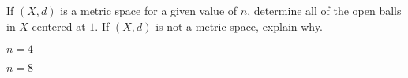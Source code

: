 {\begin{itemize}
If $(X,d)$ is a metric space for a given value of $n$, determine all of the open balls in $X$ centered at $1$. If $(X,d)$ is not a metric space, explain why. 
	\end{itemize}

\ba
\item $n = 4$

\item $n = 8$

\ea

\begin{comment}

\ExerciseSolution

\ba
\item  Since $xy-1 \pmod{4}$ is never negative, we see that $d(x,y) \geq 0$ for all $x,y \in X$. To determine if $d(x,y) = 0$ if and only if $x=y$, we calculate all of the distances as shown in Table \ref{T:d_example_4}.
\begin{table}[h]
\begin{center}
\begin{tabular}{|c|c|c|c|} \hline
		&$1$	&$3$	&$5$	\\ \hline
$1$		&$0$	&$2$	&$0$	\\ \hline
$3$		&$2$	&$0$	&$2$	\\ \hline
$5$		&$0$	&$2$	&$0$	\\ \hline
\end{tabular}
\caption{Values of $d$ with $n=4$.}
\label{T:d_example_4}
\end{center}	
\end{table}
Note that $d(1,5)=0$, but $1 \neq 5$. Thus, $d$ is not a metric on $X$. 

\item  Since $xy-1 \pmod{8}$ is never negative, we see that $d(x,y) \geq 0$ for all $x,y \in X$. To verify that $d(x,y) = 0$ if and only if $x=y$, we calculate all of the distances as shown in Table \ref{T:d_example_8}.
\begin{table}[h]
\begin{center}
\begin{tabular}{|c|c|c|c|} \hline
		&$1$	&$3$	&$5$	\\ \hline
$1$	&$0$	&$2$	&$4$	\\ \hline
$3$	&$2$	&$0$	&$6$	\\ \hline
$5$	&$4$	&$6$	&$0$	\\ \hline
\end{tabular}
\caption{Values of $d$ with $n=8$.}
\label{T:d_example_8}
\end{center}	
\end{table}
The symmetry along the main diagonal in Table \ref{T:d_example_8} also shows that $d(x,y) = d(y,x)$ for all $x, y \in X$. 


\end{comment}}
